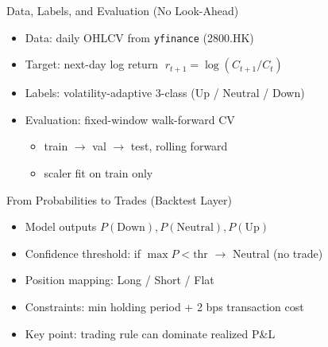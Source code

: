 \documentclass[aspectratio=169]{beamer}
\begin{document}
\begin{frame}{Data, Labels, and Evaluation (No Look-Ahead)}
  \begin{itemize}
    \item Data: daily OHLCV from \texttt{yfinance} (2800.HK)
    \item Target: next-day log return \(\; r_{t+1}=\log(C_{t+1}/C_t)\)
    \item Labels: volatility-adaptive 3-class (Up / Neutral / Down)
    \item Evaluation: fixed-window walk-forward CV
      \begin{itemize}
        \item train $\rightarrow$ val $\rightarrow$ test, rolling forward
        \item scaler fit on train only
      \end{itemize}
  \end{itemize}
\end{frame}

\begin{frame}{From Probabilities to Trades (Backtest Layer)}
  \begin{itemize}
    \item Model outputs \(P(\text{Down}), P(\text{Neutral}), P(\text{Up})\)
    \item Confidence threshold: if \(\max P < \text{thr}\) $\rightarrow$ Neutral (no trade)
    \item Position mapping: Long / Short / Flat
    \item Constraints: min holding period + 2 bps transaction cost
    \item Key point: trading rule can dominate realized P\&L
  \end{itemize}
\end{frame}
\end{document}

